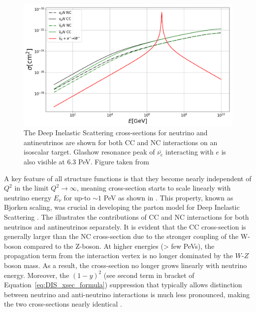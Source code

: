 \begin{figure}[h!]
        \caption[The DIS cross-sections for neutrino and antineutrinos, along with Glashow cross-section]{The Deep Inelastic Scattering cross-sections for neutrino and antineutrinos are shown for both CC and NC interactions on an isoscalar target. Glashow resonance peak of $\bar{\nu_e}$ interacting with $e$ is also visible at 6.3 PeV. Figure taken from \cite{DIS_xsec_plot}}
        \includegraphics{./figures/nu_phenomenology/xsec_DIS.png}
\end{figure}
A key feature of all structure functions is that they become nearly independent of $Q^2$ in the limit $Q^2 \rightarrow \infty$, meaning cross-section starts to scale linearly with neutrino energy $E_{\nu}$ for up-to $\sim 1$ PeV as shown in . This property, known as Bjorken scaling, was crucial in developing the parton model for Deep Inelastic Scattering .  The  illustrates the contributions of CC and NC interactions for both neutrinos and antineutrinos separately. It is evident that the CC cross-section is generally larger than the NC cross-section due to the stronger coupling of the W-boson compared to the Z-boson. At higher energies (> few PeVs), the propagation term from the interaction vertex is no longer dominated by the $W$-$Z$ boson mass. As a result, the cross-section no longer grows linearly with neutrino energy. Moreover, the $(1 - y)^2$ (see second term in bracket of Equation~\ref{eq:DIS_xsec_formula}) suppression that typically allows distinction between neutrino and anti-neutrino interactions is much less pronounced, making the two cross-sections nearly identical .

